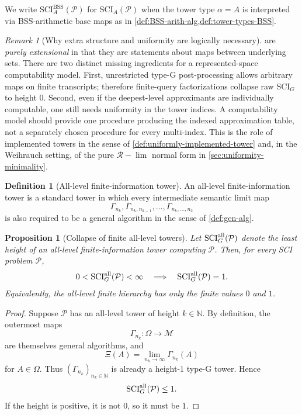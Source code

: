 \documentclass{lmcs} %
\theoremstyle{plain}
\theoremstyle{plain}
\newtheorem{proposition}[theorem]{Proposition}
\theoremstyle{definition}
\newtheorem{definition}[theorem]{Definition}
\theoremstyle{remark}
\newtheorem{remark}[theorem]{Remark}
\theoremstyle{definition}
\theoremstyle{remark}
\numberwithin{equation}{section}
\newcommand{\SCIAbss}{\mathrm{SCI}^{\mathrm{BSS}}_A}
\newcommand{\Lim}{\operatorname{lim}}
\newcommand{\SCIG}{\mathrm{SCI}_G}
\begin{document}
We write $\SCIAbss(\mathcal P)$ for $\mathrm{SCI}_A(\mathcal P)$ when the tower type $\alpha=A$
is interpreted via BSS-arithmetic base maps as in \cref{def:BSS-arith-alg,def:tower-types-BSS}.

\begin{remark}[Why extra structure and uniformity are logically necessary]\label{rem:need-extra}
 are \textit{purely extensional} in that they
are statements about maps between underlying sets. There are two distinct missing ingredients for a represented-space computability model. First, unrestricted type-G post-processing allows arbitrary maps on finite transcripts; therefore finite-query factorizations collapse raw \(\SCIG\) to height \(0\). Second, even if the deepest-level approximants are individually computable, one still
needs uniformity in the tower indices. A computability model should provide one procedure producing the indexed approximation table, not a separately chosen procedure for every multi-index. This is the role of implemented towers in the sense of \cref{def:uniformly-implemented-tower} and, in the Weihrauch setting, of the pure $\mathcal R-\Lim$ normal form in \cref{sec:uniformity-minimality}.
\end{remark}

\begin{definition}[All-level finite-information tower]\label{def:all-level-tower}
An all-level finite-information tower is a standard tower in which every intermediate semantic limit map
\[
        \Gamma_{n_k},\Gamma_{n_k,n_{k-1}},\ldots,\Gamma_{n_k,\ldots,n_2}
\]
is also required to be a general algorithm in the sense of \cref{def:gen-alg}.
\end{definition}

\begin{proposition}[Collapse of finite all-level towers]\label{prop:all-level-collapse}
Let \(\mathrm{SCI}^{\rm all}_G(\mathcal P)\) denote the least height of an all-level finite-information tower computing \(\mathcal P\). Then, for every SCI problem \(\mathcal P\),
\[
        0<\mathrm{SCI}^{\rm all}_G(\mathcal P)<\infty \quad\Longrightarrow\quad \mathrm{SCI}^{\rm all}_G(\mathcal P)=1.
\]
Equivalently, the all-level finite hierarchy has only the finite values \(0\) and \(1\).
\end{proposition}

\begin{proof}
Suppose \(\mathcal P\) has an all-level tower of height \(k\in \mathbb{N}\). By definition, the outermost maps
\[
        \Gamma_{n_k}:\Omega\to \mathcal M
\]
are themselves general algorithms, and
\[
        \Xi(A)=\lim_{n_k\to\infty}\Gamma_{n_k}(A)
\]
for $A\in\Omega$. Thus \((\Gamma_{n_k})_{n_k\in\mathbb N}\) is already a height-\(1\) type-G tower. Hence
\[
        \mathrm{SCI}^{\rm all}_G( \mathcal P)\le1.
\]
If the height is positive, it is not \(0\), so it must be \(1\).
\end{proof}
\end{document}
